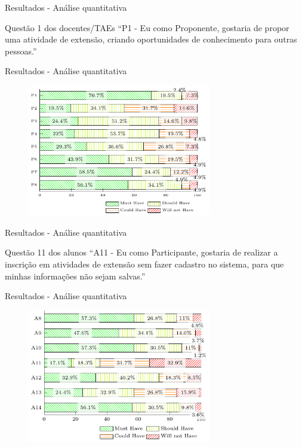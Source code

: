 \begin{frame}{{\sffamily Resultados - Análise quantitativa}}
  \begin{block}{Questão 1 dos docentes/TAEs}
    ``P1 - Eu como Proponente, gostaria de propor uma atividade de extensão, criando oportunidades de conhecimento para outras pessoas.''
  \end{block}
\end{frame}

\begin{frame}{{\sffamily Resultados - Análise quantitativa}}
  \begin{figure}
    \centering
    \includegraphics[width=8cm, ]{imagens/5-questions-proponent.pdf}
  \end{figure}
\end{frame}

\begin{frame}{{\sffamily Resultados - Análise quantitativa}}
  \begin{block}{Questão 11 dos alunos}
    ``A11 - Eu como Participante, gostaria de realizar a inscrição em atividades de extensão sem fazer cadastro no sistema, para que minhas informações não sejam salvas.''
  \end{block}
\end{frame}

\begin{frame}{{\sffamily Resultados - Análise quantitativa}}
  \begin{figure}
    \centering
    \includegraphics[width=8cm, ]{imagens/5-questions-participant-2.pdf}
  \end{figure}
\end{frame}

